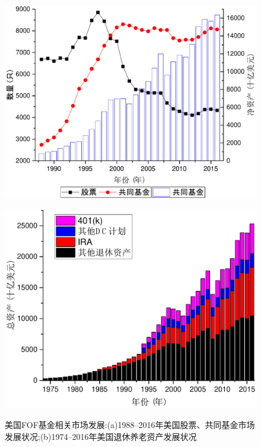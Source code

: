 \begin{figure}[ht]
\begin{minipage}[ht]{0.47\textwidth}
\centering
\includegraphics[width=1\textwidth]{pic/mutual.pdf}
\subcaption{}\label{fg:mutual}
\end{minipage}%
\hspace{0.06\textwidth}
\begin{minipage}[ht]{0.47\textwidth}
\centering
\includegraphics[width=1\textwidth]{pic/retirement.pdf}
\subcaption{}\label{fg:retirement}
\end{minipage}
\caption{美国FOF基金相关市场发展:(a)1988--2016年美国股票、共同基金市场发展状况;(b)1974--2016年美国退休养老资产发展状况}
\end{figure}

